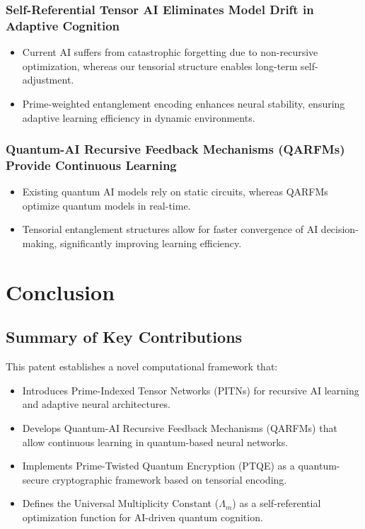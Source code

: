 \documentclass{article}
\theoremstyle{plain}
\begin{document}
\begin{itemize}
\subsubsection{Self-Referential Tensor AI Eliminates Model Drift in Adaptive Cognition}
\begin{itemize}
    \item Current AI suffers from catastrophic forgetting due to non-recursive optimization, whereas our tensorial structure enables long-term self-adjustment.
    \item Prime-weighted entanglement encoding enhances neural stability, ensuring adaptive learning efficiency in dynamic environments.
\end{itemize}

\subsubsection{Quantum-AI Recursive Feedback Mechanisms (QARFMs) Provide Continuous Learning}
\begin{itemize}
    \item Existing quantum AI models rely on static circuits, whereas QARFMs optimize quantum models in real-time.
    \item Tensorial entanglement structures allow for faster convergence of AI decision-making, significantly improving learning efficiency.
\end{itemize}

\section{Conclusion}

\subsection{Summary of Key Contributions}
This patent establishes a novel computational framework that:
\begin{itemize}
    \item Introduces Prime-Indexed Tensor Networks (PITNs) for recursive AI learning and adaptive neural architectures.
    \item Develops Quantum-AI Recursive Feedback Mechanisms (QARFMs) that allow continuous learning in quantum-based neural networks.
    \item Implements Prime-Twisted Quantum Encryption (PTQE) as a quantum-secure cryptographic framework based on tensorial encoding.
    \item Defines the Universal Multiplicity Constant ($\Lambda_m$) as a self-referential optimization function for AI-driven quantum cognition.
\end{itemize}


\end{itemize}
\end{document}
